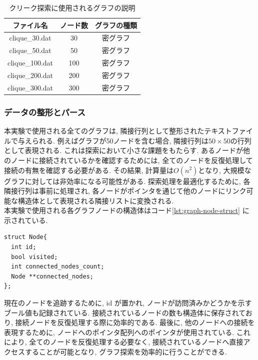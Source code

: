 \documentclass[a4j, 12pt]{jarticle}
\begin{document}
\begin{table}[H]
  \centering
  \caption{クリーク探索に使用されるグラフの説明}
  \begin{tabular}{|c|c|c|}
    \hline
    \textbf{ファイル名} & \textbf{ノード数} & \textbf{グラフの種類} \\
    \hline
    clique\_30.dat & 30 & 密グラフ \\
    clique\_50.dat & 50 & 密グラフ \\
    clique\_100.dat & 100 & 密グラフ \\
    clique\_200.dat & 200 & 密グラフ \\
    clique\_300.dat & 300 & 密グラフ \\
    \hline
  \end{tabular}\label{tab:clique_graphs}
\end{table}

\subsubsection{データの整形とパース}
本実験で使用される全てのグラフは, 隣接行列として整形されたテキストファイルで与えられる. 例えばグラフが50ノードを含む場合, 隣接行列は$50 \times 50$の行列として表現される. これは探索において小さな課題をもたらす. あるノードが他のノードに接続されているかを確認するためには, 全てのノードを反復処理して接続の有無を確認する必要がある. その結果, 計算量は$O(n^2)$となり, 大規模なグラフに対しては非効率になる可能性がある. 探索処理を最適化するために, 各隣接行列は事前に処理され, 各ノードがポインタを通じて他のノードにリンク可能な構造体として表現される隣接リストに変換される.\\
本実験で使用される各グラフノードの構造体はコード\ref{lst:graph-node-struct} に示されている.

\begin{lstlisting}[caption=グラフノードの構造,label=lst:graph-node-struct]
struct Node{
  int id;
  bool visited;
  int connected_nodes_count;
  Node **connected_nodes;
};
\end{lstlisting}

現在のノードを追跡するために, id が置かれ, ノードが訪問済みかどうかを示すブール値も記録されている. 接続されているノードの数も構造体に保存されており, 接続ノードを反復処理する際に効率的である. 最後に, 他のノードへの接続を表現するために, ノードへのポインタ配列へのポインタが使用されている. これにより, 全てのノードを反復処理する必要なく, 接続されているノードへ直接アクセスすることが可能となり, グラフ探索を効率的に行うことができる.\\
\end{document}
